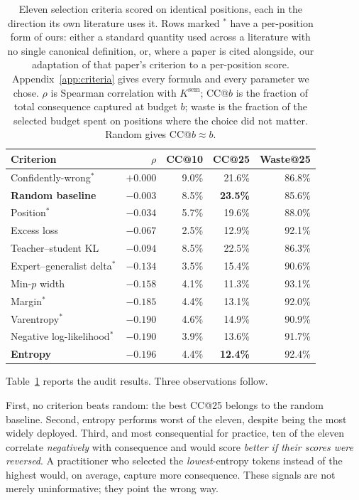 \documentclass[twoside,11pt]{article}
\begin{document}
\begin{table}[t]
\centering
\begin{tabular}{lrrrr}
\toprule
Criterion & $\rho$ & CC@10 & CC@25 & Waste@25 \\
\midrule
Confidently-wrong$^\ast$ \citep{xu2026tip} & $+0.000$ & 9.0\% & 21.6\% & 86.8\% \\
\textbf{Random baseline}       & $-0.003$ & 8.5\% & \textbf{23.5\%} & 85.6\% \\
Position$^\ast$                 & $-0.034$ & 5.7\% & 19.6\% & 88.0\% \\
Excess loss \citep{lin2024rho} & $-0.067$ & 2.5\% & 12.9\% & 92.1\% \\
Teacher--student KL \citep{hinton2015distilling} & $-0.094$ & 8.5\% & 22.5\% & 86.3\% \\
Expert--generalist delta$^\ast$ & $-0.134$ & 3.5\% & 15.4\% & 90.6\% \\
Min-$p$ width \citep{nguyen2024minp} & $-0.158$ & 4.1\% & 11.3\% & 93.1\% \\
Margin$^\ast$                   & $-0.185$ & 4.4\% & 13.1\% & 92.0\% \\
Varentropy$^\ast$               & $-0.190$ & 4.6\% & 14.9\% & 90.9\% \\
Negative log-likelihood$^\ast$  & $-0.190$ & 3.9\% & 13.6\% & 91.7\% \\
\textbf{Entropy} \citep{wang2025entropy} & $\mathbf{-0.196}$ & 4.4\% & \textbf{12.4\%} & 92.4\% \\
\bottomrule
\end{tabular}
\caption{Eleven selection criteria scored on identical positions, each in the direction its own
literature uses it. Rows marked $^\ast$ have a per-position form of ours: either a
standard quantity used across a literature with no single canonical definition, or, where a paper is
cited alongside, our adaptation of that paper's criterion to a per-position score.
Appendix~\ref{app:criteria} gives every formula and every parameter we chose. $\rho$ is Spearman correlation with $K^{\mathrm{sem}}$; CC@$b$ is the fraction of total
consequence captured at budget $b$; waste is the fraction of the selected budget spent on positions
where the choice did not matter. Random gives CC@$b \approx b$.}
\label{tab:criteria}
\end{table}

Table~\ref{tab:criteria} reports the audit results. Three observations follow.

First, no criterion beats random: the best CC@25 belongs to the random baseline. Second, entropy
performs worst of the eleven, despite being the most widely deployed. Third, and most consequential
for practice, ten of the eleven correlate \emph{negatively} with consequence and would score
\emph{better if their scores were reversed}. A practitioner who selected the \emph{lowest}-entropy
tokens instead of the highest would, on average, capture more consequence. These signals are not
merely uninformative; they point the wrong way.
\end{document}
